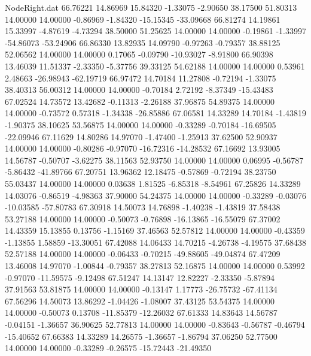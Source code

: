 \begin{filecontents}{NodeRight.dat}
  66.76221   14.86969   15.84320    -1.33075   -2.90650   38.17500   51.80313   14.00000   14.00000   -0.86969   -1.84320  -15.15345  -33.09668
  66.81274   14.19861   15.33997    -4.87619   -4.73294   38.50000   51.25625   14.00000   14.00000   -0.19861   -1.33997  -54.86073  -53.24906
  66.86330   13.82935   14.09790    -0.97263   -0.79357   38.88125   52.06562   14.00000   14.00000    0.17065   -0.09790  -10.93027   -8.91800
  66.90398   13.46039   11.51337    -2.33350   -5.37756   39.33125   54.62188   14.00000   14.00000    0.53961    2.48663  -26.98943  -62.19719
  66.97472   14.70184   11.27808    -0.72194   -1.33075   38.40313   56.00312   14.00000   14.00000   -0.70184    2.72192   -8.37349  -15.43483
  67.02524   14.73572   13.42682    -0.11313   -2.26188   37.96875   54.89375   14.00000   14.00000   -0.73572    0.57318   -1.34338  -26.85886
  67.06581   14.33289   14.70184    -1.43819   -1.90375   38.10625   53.56875   14.00000   14.00000   -0.33289   -0.70184  -16.69505  -22.09946
  67.11629   14.80286   14.97070    -1.47400   -1.25913   37.62500   52.90937   14.00000   14.00000   -0.80286   -0.97070  -16.72316  -14.28532
  67.16692   13.93005   14.56787    -0.50707   -3.62275   38.11563   52.93750   14.00000   14.00000    0.06995   -0.56787   -5.86432  -41.89766
  67.20751   13.96362   12.18475    -0.57869   -0.72194   38.23750   55.03437   14.00000   14.00000    0.03638    1.81525   -6.85318   -8.54961
  67.25826   14.33289   14.03076    -0.86519   -4.98363   37.90000   54.24375   14.00000   14.00000   -0.33289   -0.03076  -10.03585  -57.80783
  67.30918   14.50073   14.76898    -1.40238   -1.43819   37.58438   53.27188   14.00000   14.00000   -0.50073   -0.76898  -16.13865  -16.55079
  67.37002   14.43359   15.13855     0.13756   -1.15169   37.46563   52.57812   14.00000   14.00000   -0.43359   -1.13855    1.58859  -13.30051
  67.42088   14.06433   14.70215    -4.26738   -4.19575   37.68438   52.57188   14.00000   14.00000   -0.06433   -0.70215  -49.88605  -49.04874
  67.47209   13.46008   14.97070    -1.00844   -0.79357   38.27813   52.16875   14.00000   14.00000    0.53992   -0.97070  -11.59575   -9.12498
  67.51247   14.13147   12.82227    -2.33350   -5.87894   37.91563   53.81875   14.00000   14.00000   -0.13147    1.17773  -26.75732  -67.41134
  67.56296   14.50073   13.86292    -1.04426   -1.08007   37.43125   53.54375   14.00000   14.00000   -0.50073    0.13708  -11.85379  -12.26032
  67.61333   14.83643   14.56787    -0.04151   -1.36657   36.90625   52.77813   14.00000   14.00000   -0.83643   -0.56787   -0.46794  -15.40652
  67.66383   14.33289   14.26575    -1.36657   -1.86794   37.06250   52.77500   14.00000   14.00000   -0.33289   -0.26575  -15.72443  -21.49350

\end{filecontents}
